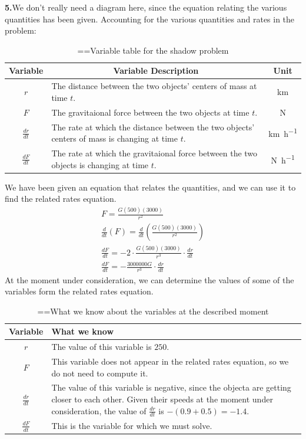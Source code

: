 \documentclass[10pt,oneside,]{book}
\theoremstyle{plain}
\theoremstyle{definition}
\numberwithin{equation}{section}
\newcommand{\lz}[2]{\frac{d#1}{d#2}}
\newcommand{\lzoo}[2]{{\frac{d}{d#1}}{\left(#2\right)}}
\begin{document}
\noindent\textbf{5.}\quad{}We don't really need a diagram here, since the equation relating the various quantities has been given. Accounting for the various quantities and rates in the problem:%
\begin{table}
\centering
\caption{\binoppenalty=\maxdimen \relpenalty=\maxdimen Variable table for the shadow problem\label{table-45}}
\begin{tabular}{cp{3.5in}c}
\toprule
Variable&\multicolumn{1}{c}{Variable Description}&Unit\\
\midrule
\(r\)&The distance between the two objects' centers of mass at time \(t\).&\si{\kilo\meter}\\
\midrule
\(F\)&The gravitaional force between the two objects at time \(t\).&\si{\newton}\\
\midrule
\(\lz{r}{t}\)&The rate at which the distance between the two objects' centers of mass is changing at time \(t\).&\si{\kilo\meter\per\hour}\\
\midrule
\(\lz{F}{t}\)&The rate at which the gravitaional force between the two objects is changing at time \(t\).&\si{\newton\per\hour}\\
\bottomrule
\end{tabular}
\end{table}
\par
We have been given an equation that relates the quantities, and we can use it to find the related rates equation.\begin{gather*}
F=\frac{G(500)(3000)}{r^2}\\
\lzoo{t}{F}=\lzoo{t}{\frac{G(500)(3000)}{r^2}}\\
\lz{F}{t}=-2\cdot\frac{G(500)(3000)}{r^3}\cdot\lz{r}{t}\\
\lz{F}{t}=-\frac{3000000G}{r^3}\cdot\lz{r}{t}
\end{gather*}At the moment under consideration, we can determine the values of some of the variables form the related rates equation.%
\begin{table}
\centering
\caption{\binoppenalty=\maxdimen \relpenalty=\maxdimen What we know about the variables at the described moment\label{table-46}}
\begin{tabular}{cp{4in}}
\toprule
Variable&What we know\\
\midrule
\(r\)&The value of this variable is \(250\).\\
\midrule
\(F\)&This variable does not appear in the related rates equation, so we do not need to compute it.\\
\midrule
\(\lz{r}{t}\)&The value of this variable is negative, since the objecta are getting closer to each other. Given their speeds at the moment under consideration, the value of \(\lz{r}{t}\) is \(-(0.9+0.5)=-1.4\).\\
\midrule
\(\lz{F}{t}\)&This is the variable for which we must solve.\\
\bottomrule
\end{tabular}
\end{table}
\end{document}
